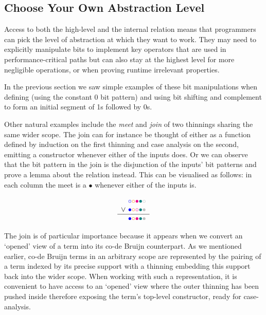 \subsection{Choose Your Own Abstraction Level}

Access to both the high-level  and the internal 
relation means that programmers can pick the level of abstraction at which they
want to work.
%
They may need to explicitly manipulate bits to implement key operators that are
used in performance-critical paths but can also stay at the highest level for
more negligible operations, or when proving runtime irrelevant properties.

In the previous section we saw simple examples of these bit manipulations when
defining  (using the constant 0 bit pattern) and
 using bit shifting and complement to form an initial segment
of 1s followed by 0s.

Other natural examples include the \emph{meet} and \emph{join} of two thinnings
sharing the same wider scope.
%
The join can for instance be thought of either as a function defined by induction
on the first thinning and case analysis on the second, emitting a 
constructor whenever either of the inputs does.
%
Or we can observe that the bit pattern in the join is the disjunction of
the inputs' bit patterns and prove a lemma about the 
relation instead.
%
This can be visualised as follows: in each column the meet is a
$\bullet$ whenever either of the inputs is.

\[
\begin{array}{c@{~}l}
& \color{blue}{\circ}\color{orange}{\circ}\color{magenta}{\bullet}\color{teal}{\bullet}\color{lightgray}{\circ} \\
  \vee & \color{blue}{\bullet}\color{orange}{\circ}\color{magenta}{\circ}\color{teal}{\bullet}\color{lightgray}{\bullet} \\
  \hline
  & \color{blue}{\bullet}\color{orange}{\circ}\color{magenta}{\bullet}\color{teal}{\bullet}\color{lightgray}{\bullet} \\
\end{array}
\]

The join is of particular importance because it appears when we convert an `opened'
view of a term into its co-de Bruijn counterpart.
%
As we mentioned earlier, co-de Bruijn terms in an arbitrary scope are represented by
the pairing of a term indexed by its precise support with a thinning embedding this
support back into the wider scope.
%
When working with such a representation, it is convenient to have access to an
`opened' view where the outer thinning has been pushed inside therefore exposing
the term's top-level constructor, ready for case-analysis.


